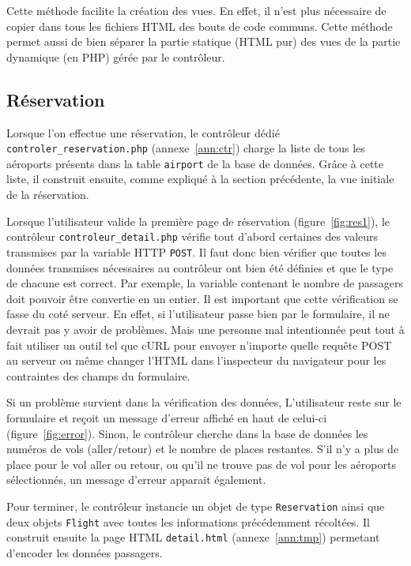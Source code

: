 \documentclass[12pt,a4paper]{article}
\begin{document}
		Cette méthode facilite la création des vues. En effet, il n'est plus nécessaire de copier dans tous les fichiers HTML des bouts de code communs. Cette méthode permet aussi de bien séparer la partie statique (HTML pur) des vues de la partie dynamique (en PHP) gérée par le contrôleur.

		\subsection{Réservation}
      Lorsque l'on effectue une réservation, le contrôleur dédié \texttt{controler\_reservation.php} (annexe~\ref{ann:ctr}) charge la liste de tous les aéroports présents dans la table \texttt{airport} de la base de données. Grâce à cette liste, il construit ensuite, comme expliqué à la section précédente, la vue initiale de la réservation.

			Lorsque l'utilisateur valide la première page de réservation (figure~\ref{fig:res1}), le contrôleur \linebreak[4] \texttt{controleur\_detail.php} vérifie tout d'abord certaines des valeurs transmises par la variable HTTP \texttt{POST}. Il faut donc bien vérifier que toutes les données transmises nécessaires au contrôleur ont bien été définies et que le type de chacune est correct. Par exemple, la variable contenant le nombre de passagers doit pouvoir être convertie en un entier. Il est important que cette vérification se fasse du coté serveur. En effet, si l'utilisateur passe bien par le formulaire, il ne devrait pas y avoir de problèmes. Mais une personne mal intentionnée peut tout à fait utiliser un outil tel que cURL pour envoyer n'importe quelle requête POST au serveur ou même changer l'HTML dans l'inspecteur du navigateur pour les contraintes des champs du formulaire.

      Si un problème survient dans la vérification des données, L'utilisateur reste sur le formulaire et reçoit un message d'erreur affiché en haut de celui-ci (figure~\ref{fig:error}). Sinon, le contrôleur cherche dans la base de données les numéros de vols (aller/retour) et le nombre de places restantes. S'il n'y a plus de place pour le vol aller ou retour, ou qu'il ne trouve pas de vol pour les aéroports sélectionnés,  un message d'erreur apparait également.


      Pour terminer, le contrôleur instancie un objet de type \texttt{Reservation} ainsi que deux objets \texttt{Flight} avec toutes les informations précédemment récoltées. Il construit ensuite la page HTML \texttt{detail.html} (annexe~\ref{ann:tmp}) permetant d'encoder les données passagers.
\end{document}
